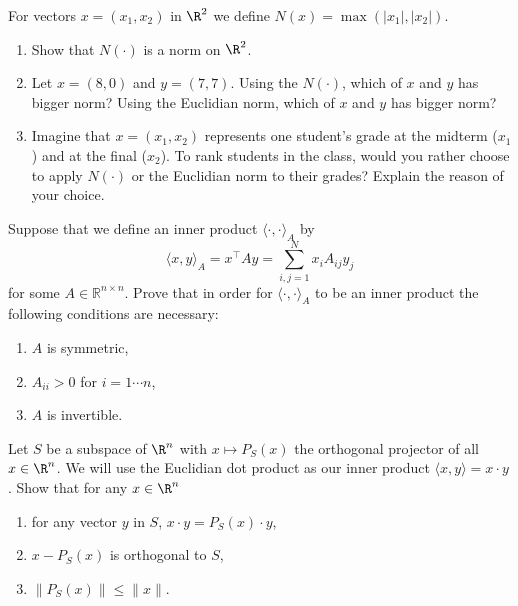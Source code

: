 \documentclass[11pt,nocut]{article}
\begin{document}



\begin{problem}[3 points]
    For vectors $x = (x_1, x_2)$ in $\R^2$ we define $N(x) = \max(|x_1|, |x_2|)$.
    \begin{enumerate}[label=\normalfont(\textbf{\alph*})]
        \item Show that $N(\cdot)$ is a norm on $\R^2$. 
        \item Let $x = (8, 0)$ and $y = (7, 7)$. Using the $N(\cdot)$, which of $x$ and $y$ has bigger norm? Using the Euclidian norm, which of $x$ and $y$ has bigger norm?
        \item Imagine that $x=(x_1,x_2)$ represents one student's grade at the midterm ($x_1$) and at the final ($x_2$). To rank students in the class, would you rather choose to apply $N(\cdot)$ or the Euclidian norm to their grades? Explain the reason of your choice.
    \end{enumerate}
\end{problem}

\vspace{1cm}

\begin{problem}[3 points]
    Suppose that we define an inner product $\langle \cdot , \cdot \rangle_A$ by $$\langle x , y \rangle_A = x ^\top A y = \sum_{i,j=1}^N x_i A_{ij}y_j$$ for some $A \in \mathbb{R}^{n\times n}$. Prove that in order for $\langle \cdot , \cdot \rangle_A$ to be an inner product the following conditions are necessary:
    \begin{enumerate}[label=\normalfont(\textbf{\alph*})]
        \item $A$ is symmetric,
        \item $A_{ii} > 0$ for $i = 1 \cdots n$,
        \item $A$ is invertible.
    \end{enumerate}  
\end{problem}

\begin{problem}[1.5 points]
    Let $S$ be a subspace of $\R^n$ with $x \mapsto P_S(x)$ the orthogonal projector of all $x \in \R^n$. We will use the Euclidian dot product as our inner product $\langle x, y\rangle = x \cdot y$. Show that for any $x \in \R^n$
    \begin{enumerate}[label=\normalfont(\textbf{\alph*})]
        \item for any vector $y$ in $S$, $x \cdot y = P_S(x) \cdot y $,
        \item $x - P_S(x)$ is orthogonal to $S$,
        \item $\lVert P_S(x) \rVert \leq \lVert x \rVert$.
    \end{enumerate}  
\end{problem}
\end{document}
